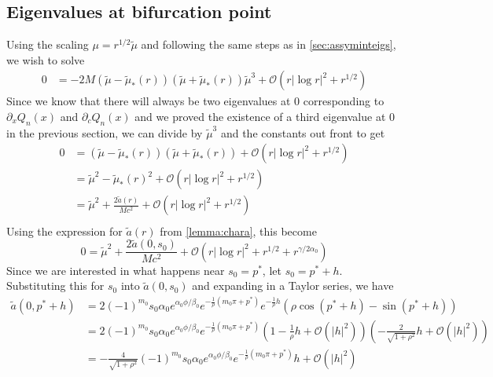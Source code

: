 \documentclass[thesis.tex]{subfiles}
\begin{document}
\subsection{Eigenvalues at bifurcation point}
Using the scaling $\mu = r^{1/2} \tilde{\mu}$ and following the same steps as in \cref{sec:assyminteigs}, we wish to solve
\begin{equation*}
\begin{aligned}
0 &= -2 M (\tilde{\mu} - \tilde{\mu}_*(r)) (\tilde{\mu} + \tilde{\mu}_*(r))\tilde{\mu}^3 + \mathcal{O}\left( r |\log r|^2 + r^{1/2} \right)
\end{aligned}
\end{equation*}
Since we know that there will always be two eigenvalues at 0 corresponding to $\partial_x Q_n(x)$ and $\partial_c Q_n(x)$ and we proved the existence of a third eigenvalue at 0 in the previous section, we can divide by $\tilde{\mu}^3$ and the constants out front to get 
\begin{align*}
0 &= (\tilde{\mu} - \tilde{\mu}_*(r)) (\tilde{\mu} + \tilde{\mu}_*(r)) + \mathcal{O}\left( r |\log r|^2 + r^{1/2} \right) \\
&= \tilde{\mu}^2 - \tilde{\mu}_*(r)^2 + \mathcal{O}\left( r |\log r|^2 + r^{1/2} \right) \\
&= \tilde{\mu}^2 + \frac{2\tilde{a}(r)}{M c^2} + \mathcal{O}\left( r |\log r|^2 + r^{1/2} \right) \\
\end{align*}
Using the expression for $\tilde{a}(r)$ from \cref{lemma:chara}, this become
\begin{equation}\label{Gsymm1}
0 = \tilde{\mu}^2 + \frac{2\tilde{a}(0, s_0)}{M c^2} + \mathcal{O}\left( r |\log r|^2 + r^{1/2} + r^{\gamma/2\alpha_0} \right)
\end{equation}
Since we are interested in what happens near $s_0 = p^*$, let $s_0 = p^* + h$. Substituting this for $s_0$ into $\tilde{a}(0, s_0)$ and expanding in a Taylor series, we have
\begin{align*}
\tilde{a}(0, p^* + h) &= 2 (-1)^{m_0} s_0 \alpha_0 e^{\alpha_0 \phi/\beta_0} e^{-\frac{1}{\rho}(m_0 \pi + p^*) } e^{-\frac{1}{\rho}h }\left( \rho \cos(p^* + h) - \sin(p^* + h) \right) \\
&= 2 (-1)^{m_0} s_0 \alpha_0 e^{\alpha_0 \phi/\beta_0} e^{-\frac{1}{\rho}(m_0 \pi + p^*) }\left( 1 - \frac{1}{\rho}h + \mathcal{O}(|h|^2) \right) \left( -\frac{2}{\sqrt{1 + \rho^2} }h + \mathcal{O}(|h|^2) \right) \\
&= -\frac{4}{\sqrt{1 + \rho^2} }(-1)^{m_0} s_0 \alpha_0 e^{\alpha_0 \phi/\beta_0} e^{-\frac{1}{\rho}(m_0 \pi + p^*) }h + \mathcal{O}(|h|^2)
\end{align*}
\end{document}
